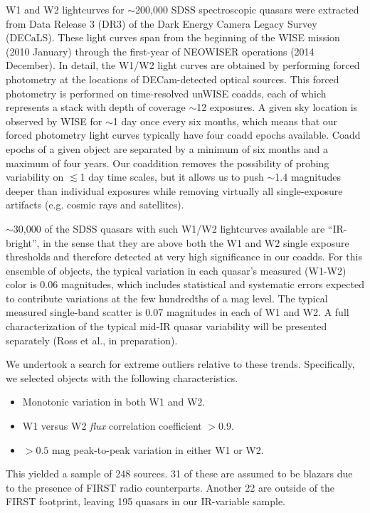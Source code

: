 \documentclass[11pt,a4paper]{article}
\begin{document}
W1 and W2 lightcurves for $\sim$200,000 SDSS spectroscopic quasars
were extracted from Data Release 3 (DR3) of the Dark Energy Camera
Legacy Survey (DECaLS). These light curves span from the beginning of
the WISE mission (2010 January) through the first-year of NEOWISER
operations (2014 December). In detail, the W1/W2 light curves are
obtained by performing forced photometry at the locations of
DECam-detected optical sources. This forced photometry is performed on
time-resolved unWISE coadds, each of which represents a stack with
depth of coverage $\sim$12 exposures. A given sky location is observed
by WISE for $\sim$1 day once every six months, which means that our
forced photometry light curves typically have four coadd epochs
available. Coadd epochs of a given object are separated by a minimum
of six months and a maximum of four years. Our coaddition removes the
possibility of probing variability on $\lesssim$1 day time scales, but
it allows us to push $\sim$1.4 magnitudes deeper than individual
exposures while removing virtually all single-exposure artifacts
(e.g. cosmic rays and satellites).

$\sim$30,000 of the SDSS quasars with such W1/W2 lightcurves available
are ``IR-bright'', in the sense that they are above both the W1 and W2
single exposure thresholds and therefore detected at very high
significance in our coadds. For this ensemble of objects, the typical
variation in each quasar's measured (W1-W2) color is 0.06 magnitudes,
which includes statistical and systematic errors expected to
contribute variations at the few hundredths of a mag level. The
typical measured single-band scatter is 0.07 magnitudes in each of W1
and W2. A full characterization of the typical mid-IR quasar
variability will be presented separately (Ross et al., in
preparation).

We undertook a search for extreme outliers relative to these trends.
Specifically, we selected objects with the following characteristics.

\begin{itemize}
\item Monotonic variation in both W1 and W2.
\item W1 versus W2 \textit{flux} correlation coefficient $>$0.9.
\item $>0.5$ mag peak-to-peak variation in either W1 or W2.
\end{itemize}

This yielded a sample of 248 sources. 31 of these are assumed to be blazars 
due to the presence of FIRST radio counterparts. Another 22 are outside of the 
FIRST  footprint, leaving 195 quasars in our IR-variable sample. 
\end{document}
